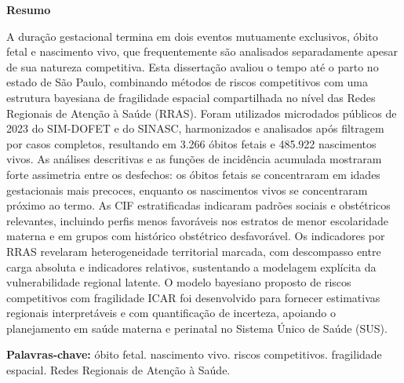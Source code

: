 %

{\centering
\large\bfseries Resumo\par}
\vspace{1.5cm}

\begin{singlespace}
A duração gestacional termina em dois eventos mutuamente exclusivos, óbito
fetal e nascimento vivo, que frequentemente são analisados separadamente
apesar de sua natureza competitiva. Esta dissertação avaliou o tempo até o
parto no estado de São Paulo, combinando métodos de riscos competitivos com
uma estrutura bayesiana de fragilidade espacial compartilhada no nível das
Redes Regionais de Atenção à Saúde (RRAS). Foram utilizados microdados
públicos de 2023 do SIM-DOFET e do SINASC, harmonizados e analisados após
filtragem por casos completos, resultando em 3.266 óbitos fetais e 485.922
nascimentos vivos. As análises descritivas e as funções de incidência
acumulada mostraram forte assimetria entre os desfechos: os óbitos fetais se
concentraram em idades gestacionais mais precoces, enquanto os nascimentos
vivos se concentraram próximo ao termo. As CIF estratificadas indicaram
padrões sociais e obstétricos relevantes, incluindo perfis menos favoráveis
nos estratos de menor escolaridade materna e em grupos com histórico
obstétrico desfavorável. Os indicadores por RRAS revelaram heterogeneidade
territorial marcada, com descompasso entre carga absoluta e indicadores
relativos, sustentando a modelagem explícita da vulnerabilidade regional
latente. O modelo
bayesiano proposto de riscos competitivos com fragilidade ICAR foi desenvolvido
para fornecer estimativas regionais interpretáveis e com quantificação de
incerteza, apoiando o planejamento em saúde materna e perinatal no Sistema
Único de Saúde (SUS).


\vspace{0.5cm}
\noindent\textbf{Palavras‑chave:} óbito fetal. nascimento vivo. riscos
competitivos. fragilidade espacial. Redes Regionais de Atenção à Saúde.
\end{singlespace}

